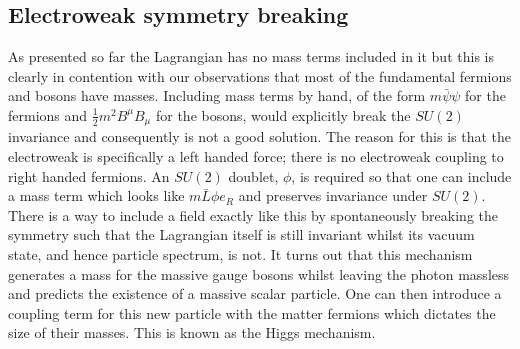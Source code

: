 \subsection{Electroweak symmetry breaking}

As presented so far the \SM Lagrangian has no mass terms included in it but this is clearly in contention with our observations that most of the fundamental fermions and bosons have masses. Including mass terms by hand, of the form $m\bar{\psi}\psi$ for the fermions and $\frac{1}{2}m^{2}B^{\mu}B_{\mu}$ for the bosons, would explicitly break the $SU(2)$ invariance and consequently is not a good solution. The reason for this is that the electroweak is specifically a left handed force; there is no electroweak coupling to right handed fermions. An $SU(2)$ doublet, $\phi$, is required so that one can include a mass term which looks like $m\bar{L}\phi e_{R}$ and preserves invariance under $SU(2)$. There is a way to include a field exactly like this by spontaneously breaking the symmetry such that the Lagrangian itself is still invariant whilst its vacuum state, and hence particle spectrum, is not. It turns out that this mechanism generates a mass for the massive gauge bosons whilst leaving the photon massless and predicts the existence of a massive scalar particle. One can then introduce a coupling term for this new particle with the matter fermions which dictates the size of their masses. This is known as the Higgs mechanism.


